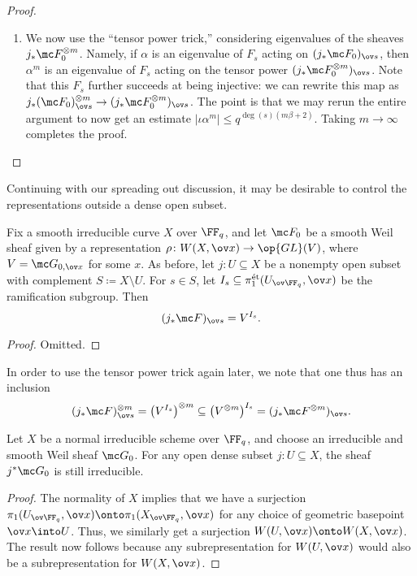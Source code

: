 \documentclass[../notes.tex]{subfiles}
\begin{document}
\begin{proof}
\begin{enumerate}
		\item We now use the ``tensor power trick,'' considering eigenvalues of the sheaves $j_*\mc F_0^{\otimes m}$. Namely, if $\alpha$ is an eigenvalue of $F_s$ acting on $(j_*\mc F_0)_{\ov s}$, then $\alpha^m$ is an eigenvalue of $F_s$ acting on the tensor power $(j_*\mc F_0^{\otimes m})_{\ov s}$. Note that this $F_s$ further succeeds at being injective: we can rewrite this map as $j_*(\mc F_0)_{\ov s}^{\otimes m}\to (j_*\mc F^{\otimes m}_0)_{\ov s}$. The point is that we may rerun the entire argument to now get an estimate $\left|\iota\alpha^m\right|\le q^{\deg(s)(m\beta+2)}$. Taking $m\to\infty$ completes the proof.
		\qedhere
	\end{enumerate}
\end{proof}
Continuing with our spreading out discussion, it may be desirable to control the representations outside a dense open subset.
\begin{lemma}
	Fix a smooth irreducible curve $X$ over $\FF_q$, and let $\mc F_0$ be a smooth Weil sheaf given by a representation $\rho\colon W(X,\ov x)\to\op{GL}(V)$, where $V=\mc G_{0,\ov x}$ for some $x$. As before, let $j\colon U\subseteq X$ be a nonempty open subset with complement $S\coloneqq X\setminus U$. For $s\in S$, let $I_s\subseteq\pi_1^{\mathrm{\acute et}}(U_{\ov\FF_q},\ov x)$ be the ramification subgroup. Then
	\[(j_*\mc F)_{\ov s}=V^{I_s}.\]
\end{lemma}
\begin{proof}
	Omitted.
\end{proof}
\begin{remark}
	In order to use the tensor power trick again later, we note that one thus has an inclusion
	\[(j_*\mc F)_{\ov s}^{\otimes m}=\left(V^{I_s}\right)^{\otimes m}\subseteq\left(V^{\otimes m}\right)^{I_s}=(j_*\mc F^{\otimes m})_{\ov s}.\]
\end{remark}
\begin{lemma}
	Let $X$ be a normal irreducible scheme over $\FF_q$, and choose an irreducible and smooth Weil sheaf $\mc G_0$. For any open dense subset $j\colon U\subseteq X$, the sheaf $j^*\mc G_0$ is still irreducible.
\end{lemma}
\begin{proof}
	The normality of $X$ implies that we have a surjection $\pi_1(U_{\ov\FF_q},\ov x)\onto\pi_1(X_{\ov\FF_q},\ov x)$ for any choice of geometric basepoint $\ov x\into U$. Thus, we similarly get a surjection $W(U,\ov x)\onto W(X,\ov x)$. The result now follows because any subrepresentation for $W(U,\ov x)$ would also be a subrepresentation for $W(X,\ov x)$.
\end{proof}
\end{document}
